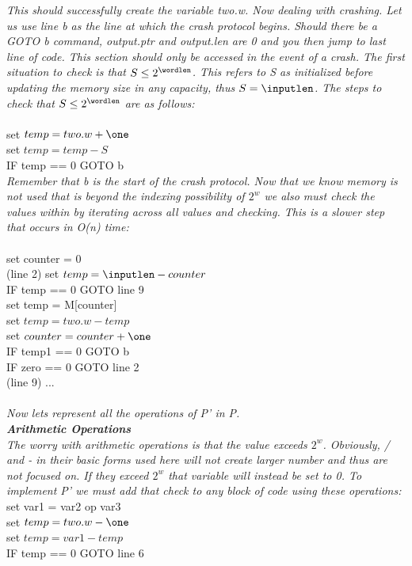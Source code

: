 \documentclass[11pt]{article}
\begin{document}
\begin{enumerate}
\textit{
This should successfully create the variable two.w. Now dealing with crashing. Let us use line b as the line at which the crash protocol begins. Should there be a GOTO b command, output.ptr and output.len are 0 and you then jump to last line of code. This section should only be accessed in the event of a crash. The first situation to check is that $S \leq 2^{\wordlen}$. This refers to S as initialized before updating the memory size in any capacity, thus $S = \inputlen$. The steps to check that $S \leq 2^{\wordlen}$ are as follows:
    }
\\\\ set $temp = two.w + \one$
\\ set $temp = temp - S$
\\ IF temp == 0 GOTO b
\\ \textit{Remember that b is the start of the crash protocol. Now that we know memory is not used that is beyond the indexing possibility of $2^w$ we also must check the values within by iterating across all values and checking. This is a slower step that occurs in O(n) time: 
}
\\\\ set counter = 0 
\\ (line 2) set $temp = \inputlen - counter$
\\ IF temp == 0 GOTO line 9
\\ set temp = M[counter]
\\ set $temp = two.w - temp$
\\ set $counter = counter + \one$
\\ IF temp1 == 0 GOTO b
\\ IF zero == 0 GOTO line 2
\\ (line 9) ... 
\\\\\textit{
Now lets represent all the operations of P' in P. 
\\ \textbf{Arithmetic Operations}
\\ The worry with arithmetic operations is that the value exceeds $2^w$. Obviously, / and - in their basic forms used here will not create larger number and thus are not focused on. If they exceed $2^w$ that variable will instead be set to 0. To implement P' we must add that check to any block of code using these operations: 
}
\\set var1 = var2 op var3
\\set $temp = two.w - \one$
\\set $temp = var1 - temp$
\\IF temp == 0 GOTO line 6

\end{enumerate}
\end{document}
